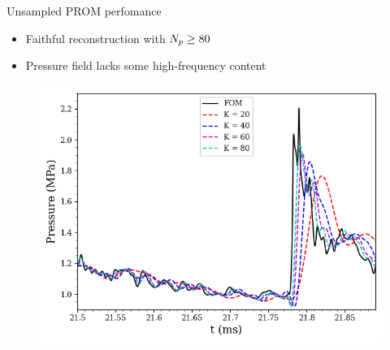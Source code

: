 \documentclass[]{beamer}
\begin{document}
\begin{frame}{Unsampled PROM perfomance}
	\begin{itemize}
		\item Faithful reconstruction with $N_p \ge 80$
		\item Pressure field lacks some high-frequency content
	\end{itemize}
	\begin{figure}
		\begin{minipage}{0.49\linewidth}
			\includegraphics[width=0.99\linewidth]{Images/experiments/9elem/point_3_Static_Pressure.png}
		\end{minipage}
		\begin{minipage}{0.45\linewidth}
		\end{minipage}
	\end{figure}
\end{frame}
\end{document}
